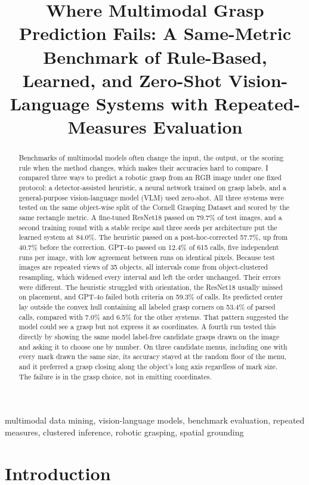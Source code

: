 \documentclass[10pt,conference,compsoc]{IEEEtran}
\title{Where Multimodal Grasp Prediction Fails: A Same-Metric Benchmark of Rule-Based, Learned, and Zero-Shot Vision-Language Systems with Repeated-Measures Evaluation}
\author{\IEEEauthorblockN{Anish Talla}
\IEEEauthorblockA{\textit{High School Student}\\
United States}}
\begin{document}
\maketitle

\begin{abstract}
Benchmarks of multimodal models often change the input, the output, or
the scoring rule when the method changes, which makes their accuracies
hard to compare. I compared three ways to predict a robotic grasp from an
RGB image under one fixed protocol: a detector-assisted heuristic, a
neural network trained on grasp labels, and a general-purpose
vision-language model (VLM) used zero-shot. All three systems
were tested on the same object-wise split of the Cornell Grasping Dataset and
scored by the same rectangle metric. A fine-tuned ResNet18 passed on 79.7\%
of test images, and a second training round with a stable recipe and three
seeds per architecture put the learned system at 84.0\%. The heuristic
passed on a post-hoc-corrected 57.7\%, up from 40.7\% before the
correction. GPT-4o passed on 12.4\% of 615 calls, five independent runs per image,
with low agreement between runs on identical pixels. Because test images
are repeated views of 35 objects, all intervals come from object-clustered
resampling, which widened every interval and left the order unchanged. Their errors were different. The heuristic struggled with
orientation, the ResNet18 usually missed on placement, and GPT-4o failed
both criteria on 59.3\% of calls. Its predicted
center lay outside the convex hull containing all labeled grasp corners on 53.4\%
of parsed calls, compared with 7.0\% and 6.5\% for the other systems. That
pattern suggested the model could see a grasp but not express it as
coordinates. A fourth run tested this directly by showing the same model
label-free candidate grasps drawn on the image and asking it to choose one
by number. On three candidate menus, including one with every mark drawn
the same size, its accuracy stayed at the random floor of the menu, and it
preferred a grasp closing along the object's long axis regardless of mark
size. The failure is in the grasp choice, not in emitting coordinates.
\end{abstract}

\begin{IEEEkeywords}
multimodal data mining, vision-language models, benchmark evaluation,
repeated measures, clustered inference, robotic grasping, spatial grounding
\end{IEEEkeywords}

\section{Introduction}
\end{document}
